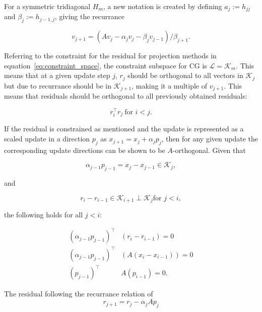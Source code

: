 For a symmetric tridiagonal $H_m$, a new notation is created by defining $a_j := h_{jj}$ and $\beta_j := h_{j-1, j}$, giving the recurrance

\begin{equation}
    v_{j+1} = \left(A v_j - \alpha_j v_j - \beta_j v_{j-1}\right)/\beta_{j+1}.
\end{equation}

Referring to the constraint for the residual for projection methods in equation~\ref{eq:constraint_space}, the constraint subspace for CG is $\mathcal{L} = \mathcal{K}_m$. This means that at a given update step $j$, $r_j$ should be orthogonal to all vectors in $\mathcal{K}_j$ but due to recurrance should be in $\mathcal{K}_{j+1}$, making it a multiple of $v_{j+1}$. This means that residuals should be orthogonal to all previously obtained residuals:

\begin{equation}
    r_i^\top r_j\ \text{for $i < j$}.
\end{equation}

If the residual is constrained as mentioned and the update is represented as a scaled update in a direction $p_j$ as $x_{j+1} = x_{j} + \alpha_j p_j$, then for any given update the corresponding update directions can be shown to be $A$-orthogonal. Given that 

\begin{equation}
	\alpha_{j-1}p_{j-1} = x_{j} - x_{j-1} \in \mathcal{K}_j,
\end{equation} 

and 

\begin{equation}
r_i - r_{i-1} \in \mathcal{K}_{i+1} \perp \mathcal{K}_j \text{for $j < i$}, 
\end{equation}

the following holds for all $j < i$:

\begin{equation}
    \label{eq:A_orth}
    \begin{aligned}
    \left(\alpha_{j-1}p_{j-1}\right)^\top& \left(r_i - r_{i-1}\right) = 0 \\
    \left(\alpha_{j-1}p_{j-1}\right)^\top &\left(A \left(x_i - x_{i-1}\right)\right) = 0 \\
    \left(p_{j-1}\right)^\top& A \left(p_{i-1}\right) = 0.
    \end{aligned}
\end{equation}

The residual following the recurrance relation of
\begin{equation}
    r_{j+1} = r_j - \alpha_j A p_j
\end{equation}

